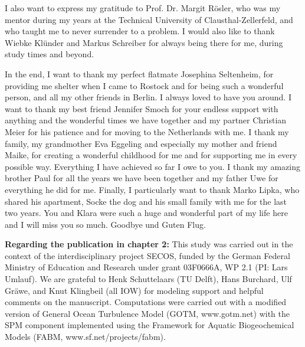 I also want to express my gratitude to Prof. Dr. Margit Rösler, who was my 
mentor during my years at the Technical University of Clausthal-Zellerfeld, and 
who taught me to never surrender to a problem. I would also like to thank 
Wiebke Klünder and Markus Schreiber for always being there for me, during study 
times and beyond.

In the end, I want to thank my perfect flatmate Josephina Seltenheim, for 
providing me shelter when I came to Rostock and for being such a wonderful 
person, and all my other friends in Berlin. I always loved to have you around. 
I want to thank my best friend Jennifer Smoch for your endless support with 
anything and the wonderful times we have together and my partner Christian 
Meier for his patience and for moving to the Netherlands with me. I thank my 
family, my grandmother Eva Eggeling and especially my mother and friend Maike, 
for creating a wonderful childhood for me and for supporting me in every 
possible way. Everything I have achieved so far I owe to you. I thank my amazing 
brother Paul for all the years we have been together and my father Uwe for 
everything he did for me. Finally, I particularly want to thank Marko 
Lipka, who shared his apartment, Socke the dog and his small family with me for 
the last two years. You and Klara were such a huge and wonderful part of my 
life here and I will miss you so much. Goodbye und Guten Flug. 

\textbf{Regarding the publication in chapter 2:} This study was carried out in 
the context of the
interdisciplinary project SECOS, funded by the German Federal Ministry
of Education and Research under grant 03F0666A, WP 2.1 (PI: Lars
Umlauf). We are grateful to Henk Schuttelaars (TU Delft), Hans
Burchard, Ulf Gr{\"a}we, and Knut Klingbeil (all IOW) for modeling
support and helpful comments on the manuscript. Computations were
carried out with a modified version of General Ocean Turbulence Model
(GOTM, www.gotm.net) with the SPM component implemented using the
Framework for Aquatic Biogeochemical Models (FABM,
www.sf.net/projects/fabm).
\newpage

\tableofcontents
